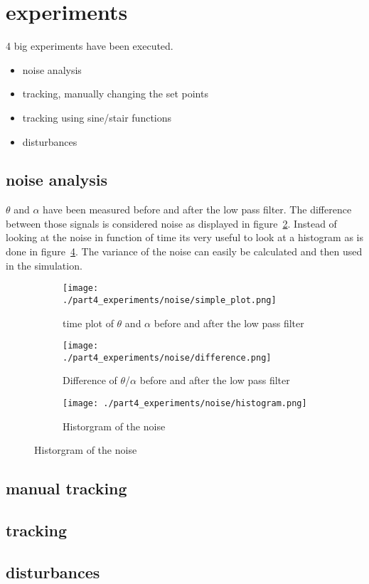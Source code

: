 \section{experiments}

4 big experiments have been executed.

\begin{itemize}
	\item noise analysis
	\item tracking, manually changing the set points
	\item tracking using sine/stair functions
	\item disturbances
\end{itemize}


\subsection{noise analysis}


$\theta$ and $\alpha$ have been measured before and after the low pass filter. The difference between those signals is considered noise as displayed in figure~\ref{fig:time plot noise}. Instead of looking at the noise in function of time its very useful to look at a histogram as is done in figure~\ref{fig:hist noise}. The variance of the noise can easily be calculated and then used in the simulation.

\begin{figure}[H]
	\centering
	\begin{subfigure}[b]{0.45\textwidth}
		\texttt{[image: ./part4\_experiments/noise/simple\_plot.png]}
		\caption{time plot of $\theta$ and $\alpha$ before and after the low pass filter}
		\label{fig:time plot theta and alpha}
	\end{subfigure}
	\begin{subfigure}[b]{0.45\textwidth}
		\texttt{[image: ./part4\_experiments/noise/difference.png]}
		\caption{Difference of $\theta$/$\alpha$ before and after the low pass filter}
		\label{fig:time plot noise}
	\end{subfigure}
	\begin{subfigure}[b]{0.45\textwidth}
		\texttt{[image: ./part4\_experiments/noise/histogram.png]}
		\caption{Historgram of the noise}
		\label{fig:hist noise}
	\end{subfigure}
\end{figure}

\subsection{manual tracking}

\subsection{tracking}

\subsection{disturbances}